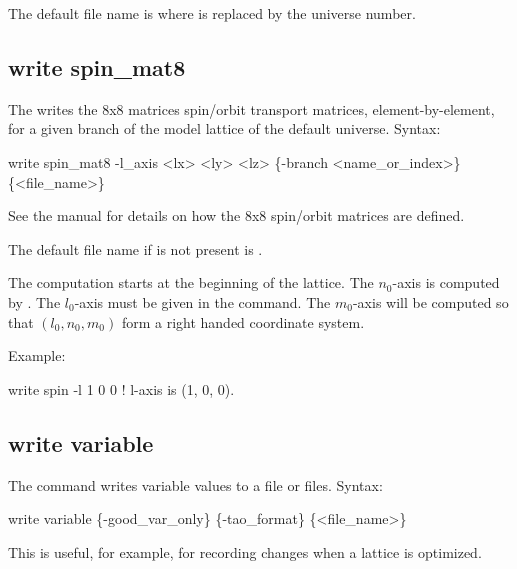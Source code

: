{{{{{{{{{{{The default file name is  where \vn{\#} is replaced by the universe number. 


\subsection{write spin_mat8}
\label{s:write.spin.mat8}

The  writes the 8x8 matrices spin/orbit transport matrices, element-by-element, for
a given branch of the model lattice of the default universe.
Syntax:
\begin{example}
  write spin_mat8 -l_axis <lx> <ly> <lz> \{-branch <name_or_index>\} \{<file_name>\}
\end{example}
See the \bmad manual for details on how the 8x8 spin/orbit matrices are defined. 

The default file name if  is not present is .

The computation starts at the beginning of the lattice. The $n_0$-axis is computed by \bmad. The
$l_0$-axis must be given in the  command.  The $m_0$-axis will be computed so
that $(l_0, n_0, m_0)$ form a right handed coordinate system.

Example:
\begin{example}
  write spin -l 1 0 0    ! l-axis is (1, 0, 0).
\end{example}


\subsection{write variable}
\label{s:write.variable}

The  command writes \tao variable values to a file or files.
Syntax:
\begin{example}
  write variable \{-good_var_only\} \{-tao_format\} \{<file_name>\} 
\end{example}
This is useful, for example, for recording changes when a lattice is optimized.

}}}}}}}}}}}
